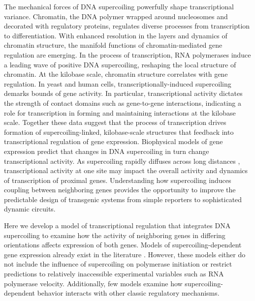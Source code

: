 \documentclass[11pt]{article}
\begin{document}
The mechanical forces of DNA supercoiling powerfully shape transcriptional variance.\parencite{desaiDNArepairPathwayCan2021,chongMechanismTranscriptionalBursting2014}
Chromatin, the DNA polymer wrapped around nucleosomes and decorated with regulatory proteins, regulates diverse processes from transcription to differentiation. With enhanced resolution in the layers and dynamics of chromatin structure, the manifold functions of chromatin-mediated gene regulation are emerging.\parencite{hsiehResolving3DLandscape2020,krietensteinUltrastructuralDetailsMammalian2020}
In the process of transcription, RNA polymerases induce a leading wave of positive DNA supercoiling\parencite{wuTranscriptionGeneratesPositively1988,liuSupercoilingDNATemplate1987}, reshaping the local structure of chromatin.\parencite{acharNegativeSupercoilGene2020,tevesTranscriptiongeneratedTorsionalStress2014a,naughtonTranscriptionFormsRemodels2013,guoHighresolutionGenomewideMapping2021a}
At the kilobase scale, chromatin structure correlates with gene regulation.\parencite{hsiehResolving3DLandscape2020,rowleyEvolutionarilyConservedPrinciples2017}
In yeast and human cells, transcriptionally-induced supercoiling demarks bounds of gene activity.\parencite{acharNegativeSupercoilGene2020,naughtonTranscriptionFormsRemodels2013}
In particular, transcriptional activity dictates the strength of contact domains such as gene-to-gene interactions, indicating a role for transcription in forming and maintaining interactions at the kilobase scale.\parencite{rowleyOrganizationalPrinciples3D2018,rowleyEvolutionarilyConservedPrinciples2017}
Together these data suggest that the process of transcription drives formation of supercoiling-linked, kilobase-scale structures that feedback into transcriptional regulation of gene expression. Biophysical models of gene expression predict that changes in DNA supercoiling in turn change transcriptional activity.\parencite{sevierPropertiesGeneExpression2018}
As supercoiling rapidly diffuses across long distances \parencite{loenhoutDynamicsDNASupercoils2012}, transcriptional activity at one site may impact the overall activity and dynamics of transcription of proximal genes.\parencite{sevierCollectivePolymeraseDynamics2022,tripathiDNASupercoilingmediatedCollective2021}
Understanding how supercoiling induces coupling between neighboring genes provides the opportunity to improve the predictable design of transgenic systems from simple reporters to sophisticated dynamic circuits.

Here we develop a model of transcriptional regulation that integrates DNA supercoiling to examine how the activity of neighboring genes in differing orientations affects expression of both genes. Models of supercoiling-dependent gene expression already exist in the literature \parencite{sevierCollectivePolymeraseDynamics2022,tripathiDNASupercoilingmediatedCollective2021}. However, these models either do not include the influence of supercoiling on polymerase initiation or restrict predictions to relatively inaccessible experimental variables such as RNA polymerase velocity. Additionally, few models examine how supercoiling-dependent behavior interacts with other classic regulatory mechanisms.
\end{document}
